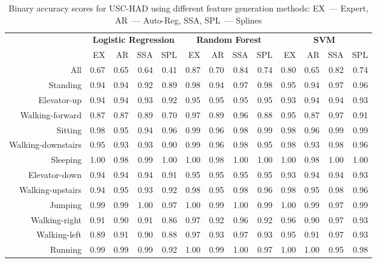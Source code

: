 \begin{table}[!h]
	\centering
	\tiny
	\caption{Binary accuracy scores for USC-HAD using different feature generation methods: EX~--- Expert, AR~--- Auto-Reg, SSA, SPL~--- Splines}
	\label{my-label}
	\begin{tabular}{|r|rrrr|rrrr|rrrr|}
		\hline
		& \multicolumn{4}{c|}{\textbf{Logistic Regression}} & \multicolumn{4}{c|}{\textbf{Random Forest}} & \multicolumn{4}{c|}{\textbf{SVM}}          \\ \cline{2-13} 
		& EX   & AR   & SSA   & SPL  & EX  & AR & SSA & SPL & EX & AR & SSA & SPL \\ \hline
		All& 0.67 & 0.65 & 0.64 & 0.41 & 0.87 & 0.70 & 0.84 & 0.74 & 0.80 & 0.65 & 0.82 & 0.74 \\
		Standing& 0.94 & 0.94 & 0.92 & 0.89 & 0.98 & 0.94 & 0.97 & 0.98 & 0.95 & 0.94 & 0.97 & 0.96 \\
		Elevator-up& 0.94 & 0.94 & 0.93 & 0.92 & 0.95 & 0.95 & 0.95 & 0.95 & 0.93 & 0.94 & 0.94 & 0.93 \\
		Walking-forward& 0.87 & 0.87 & 0.89 & 0.70 & 0.97 & 0.89 & 0.96 & 0.88 & 0.95 & 0.87 & 0.97 & 0.91 \\
		Sitting& 0.98 & 0.95 & 0.94 & 0.96 & 0.99 & 0.96 & 0.98 & 0.99 & 0.98 & 0.96 & 0.99 & 0.99 \\
		Walking-downstairs& 0.95 & 0.93 & 0.93 & 0.90 & 0.99 & 0.96 & 0.98 & 0.95 & 0.98 & 0.93 & 0.98 & 0.96 \\
		Sleeping& 1.00 & 0.98 & 0.99 & 1.00 & 1.00 & 0.98 & 1.00 & 1.00 & 1.00 & 0.98 & 1.00 & 1.00 \\
		Elevator-down& 0.94 & 0.94 & 0.94 & 0.91 & 0.95 & 0.95 & 0.95 & 0.95 & 0.93 & 0.94 & 0.94 & 0.93 \\
		Walking-upstairs& 0.94 & 0.95 & 0.93 & 0.92 & 0.98 & 0.95 & 0.98 & 0.96 & 0.98 & 0.95 & 0.98 & 0.96 \\
		Jumping& 0.99 & 0.99 & 1.00 & 0.97 & 1.00 & 0.99 & 1.00 & 0.99 & 1.00 & 0.99 & 0.97 & 0.99 \\
		Walking-right& 0.91 & 0.90 & 0.91 & 0.86 & 0.97 & 0.92 & 0.96 & 0.92 & 0.96 & 0.90 & 0.97 & 0.93 \\
		Walking-left& 0.89 & 0.91 & 0.90 & 0.88 & 0.97 & 0.93 & 0.97 & 0.93 & 0.95 & 0.91 & 0.97 & 0.93 \\
		Running& 0.99 & 0.99 & 0.99 & 0.92 & 1.00 & 0.99 & 1.00 & 0.97 & 1.00 & 1.00 & 0.95 & 0.98\\ \hline
	\end{tabular}
	\label{tbl::uschad_methods_results}
\end{table}


